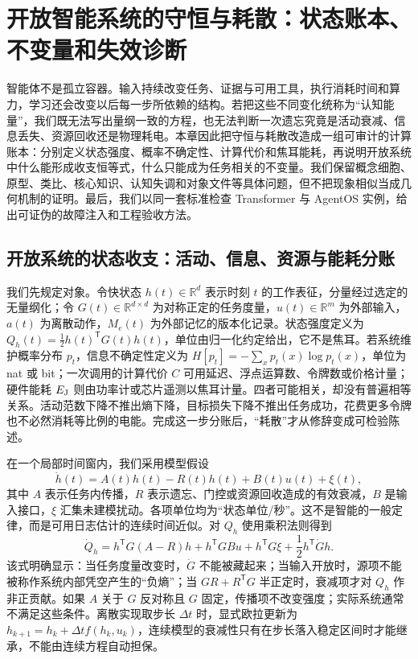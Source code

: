 \chapter{开放智能系统的守恒与耗散：状态账本、不变量和失效诊断}
\label{chp:physics_of_conservation_and_dissipation}

智能体不是孤立容器。输入持续改变任务、证据与可用工具，执行消耗时间和算力，学习还会改变以后每一步所依赖的结构。若把这些不同变化统称为“认知能量”，我们既无法写出量纲一致的方程，也无法判断一次遗忘究竟是活动衰减、信息丢失、资源回收还是物理耗电。本章因此把守恒与耗散改造成一组可审计的计算账本：分别定义状态强度、概率不确定性、计算代价和焦耳能耗，再说明开放系统中什么能形成收支恒等式，什么只能成为任务相关的不变量。我们保留概念细胞、原型、类比、核心知识、认知失调和对象文件等具体问题，但不把现象相似当成几何机制的证明。最后，我们以同一套标准检查 Transformer 与 AgentOS 实例，给出可证伪的故障注入和工程验收方法。

\section{开放系统的状态收支：活动、信息、资源与能耗分账}
\label{sec:absolute_non_conservation_of_energy}

我们先规定对象。令快状态 $h(t)\in\mathbb{R}^{d}$ 表示时刻 $t$ 的工作表征，分量经过选定的无量纲化；令 $G(t)\in\mathbb{R}^{d\times d}$ 为对称正定的任务度量，$u(t)\in\mathbb{R}^{m}$ 为外部输入，$a(t)$ 为离散动作，$M_e(t)$ 为外部记忆的版本化记录。状态强度定义为 $Q_h(t)=\frac12 h(t)^{\mathsf T}G(t)h(t)$，单位由归一化约定给出，它不是焦耳。若系统维护概率分布 $p_t$，信息不确定性定义为 $H[p_t]= -\sum_xp_t(x)\log p_t(x)$，单位为 nat 或 bit；一次调用的计算代价 $C$ 可用延迟、浮点运算数、令牌数或价格计量；硬件能耗 $E_{\rm J}$ 则由功率计或芯片遥测以焦耳计量。四者可能相关，却没有普遍相等关系。活动范数下降不推出熵下降，目标损失下降不推出任务成功，花费更多令牌也不必然消耗等比例的电能。完成这一步分账后，“耗散”才从修辞变成可检验陈述。

在一个局部时间窗内，我们采用模型假设
\[
 \dot h(t)=A(t)h(t)-R(t)h(t)+B(t)u(t)+\xi(t),
\]
其中 $A$ 表示任务内传播，$R$ 表示遗忘、门控或资源回收造成的有效衰减，$B$ 是输入接口，$\xi$ 汇集未建模扰动。各项单位均为“状态单位/秒”。这不是智能的一般定律，而是可用日志估计的连续时间近似。对 $Q_h$ 使用乘积法则得到
\[
 \dot Q_h=h^{\mathsf T}G(A-R)h+h^{\mathsf T}GBu+h^{\mathsf T}G\xi
 +\frac12h^{\mathsf T}\dot Gh .
\]
该式明确显示：当任务度量改变时，$\dot G$ 不能被藏起来；当输入开放时，源项不能被称作系统内部凭空产生的“负熵”；当 $G R+R^{\mathsf T}G$ 半正定时，衰减项才对 $Q_h$ 作非正贡献。如果 $A$ 关于 $G$ 反对称且 $G$ 固定，传播项不改变强度；实际系统通常不满足这些条件。离散实现取步长 $\Delta t$ 时，显式欧拉更新为 $h_{k+1}=h_k+\Delta t f(h_k,u_k)$，连续模型的衰减性只有在步长落入稳定区间时才能继承，不能由连续方程自动担保。

